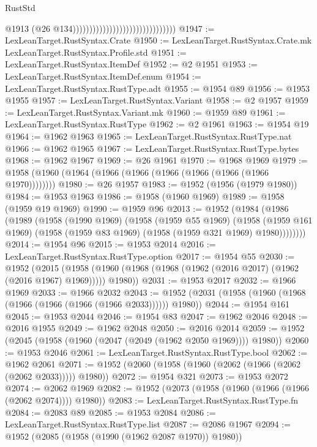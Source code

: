 \begin{lexlean}{RustStd}
\begin{coremodule}
{\begin{coremodule}
{{{{{{{{{{{{{{{{{{{{{{{{{{{{{{{{{{                                                                @1913
                                                                (@26
                                                                  @134)))))))))))))))))))))))))))))))
@1947 := LexLeanTarget.RustSyntax.Crate
@1950 := LexLeanTarget.RustSyntax.Crate.mk LexLeanTarget.RustSyntax.Profile.std
@1951 := LexLeanTarget.RustSyntax.ItemDef
@1952 := @2 @1951
@1953 := LexLeanTarget.RustSyntax.ItemDef.enum
@1954 := LexLeanTarget.RustSyntax.RustType.adt
@1955 := @1954 @89
@1956 := @1953 @1955
@1957 := LexLeanTarget.RustSyntax.Variant
@1958 := @2 @1957
@1959 := LexLeanTarget.RustSyntax.Variant.mk
@1960 := @1959 @89
@1961 := LexLeanTarget.RustSyntax.RustType
@1962 := @2 @1961
@1963 := @1954 @19
@1964 := @1962 @1963
@1965 := LexLeanTarget.RustSyntax.RustType.nat
@1966 := @1962 @1965
@1967 := LexLeanTarget.RustSyntax.RustType.bytes
@1968 := @1962 @1967
@1969 := @26 @1961
@1970 := @1968 @1969
@1979 := @1958 (@1960 (@1964 (@1966 (@1966 (@1966 (@1966 (@1966 (@1966 @1970))))))))
@1980 := @26 @1957
@1983 := @1952 (@1956 (@1979 @1980))
@1984 := @1953 @1963
@1986 := @1958 (@1960 @1969)
@1989 := @1958 (@1959 @19 @1969)
@1990 := @1959 @96
@2013 := @1952
    (@1984
      (@1986
        (@1989
          (@1958
            (@1990 @1969)
            (@1958
              (@1959 @55 @1969)
              (@1958
                (@1959 @161 @1969)
                (@1958 (@1959 @83 @1969) (@1958 (@1959 @321 @1969) @1980))))))))
@2014 := @1954 @96
@2015 := @1953 @2014
@2016 := LexLeanTarget.RustSyntax.RustType.option
@2017 := @1954 @55
@2030 := @1952
    (@2015 (@1958 (@1960 (@1968 (@1968 (@1962 (@2016 @2017) (@1962 (@2016 @1967) @1969))))) @1980))
@2031 := @1953 @2017
@2032 := @1966 @1969
@2033 := @1966 @2032
@2043 := @1952 (@2031 (@1958 (@1960 (@1968 (@1966 (@1966 (@1966 (@1966 @2033)))))) @1980))
@2044 := @1954 @161
@2045 := @1953 @2044
@2046 := @1954 @83
@2047 := @1962 @2046
@2048 := @2016 @1955
@2049 := @1962 @2048
@2050 := @2016 @2014
@2059 := @1952 (@2045 (@1958 (@1960 (@2047 (@2049 (@1962 @2050 @1969)))) @1980))
@2060 := @1953 @2046
@2061 := LexLeanTarget.RustSyntax.RustType.bool
@2062 := @1962 @2061
@2071 := @1952 (@2060 (@1958 (@1960 (@2062 (@1966 (@2062 (@2062 @2033))))) @1980))
@2072 := @1954 @321
@2073 := @1953 @2072
@2074 := @2062 @1969
@2082 := @1952 (@2073 (@1958 (@1960 (@1966 (@1966 (@2062 @2074)))) @1980))
@2083 := LexLeanTarget.RustSyntax.RustType.fn
@2084 := @2083 @89
@2085 := @1953 @2084
@2086 := LexLeanTarget.RustSyntax.RustType.list
@2087 := @2086 @1967
@2094 := @1952 (@2085 (@1958 (@1990 (@1962 @2087 @1970)) @1980))
}}}}}}}}}}}}}}}}}}}}}}}}}}}}}}}}}}
\end{coremodule}}
\end{coremodule}
\end{lexlean}
